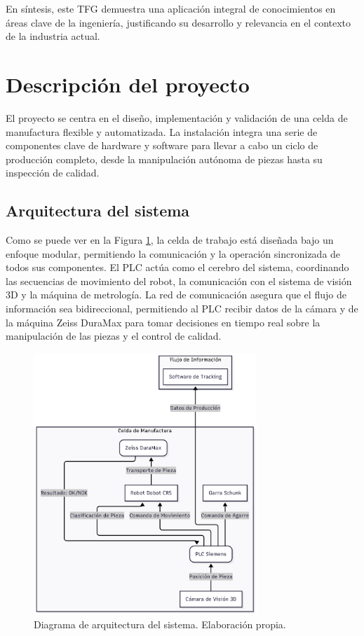 \documentclass[12pt, a4paper]{article}
\begin{document}
En síntesis, este TFG demuestra una aplicación integral de conocimientos en áreas clave de la ingeniería, justificando su desarrollo y relevancia en el contexto de la industria actual.

\section{Descripción del proyecto}
El proyecto se centra en el diseño, implementación y validación de una celda de manufactura flexible y automatizada. La instalación integra una serie de componentes clave de hardware y software para llevar a cabo un ciclo de producción completo, desde la manipulación autónoma de piezas hasta su inspección de calidad.

\subsection{Arquitectura del sistema}
Como se puede ver en la Figura \ref{fig:arquitectura}, la celda de trabajo está diseñada bajo un enfoque modular, permitiendo la comunicación y la operación sincronizada de todos sus componentes. El PLC actúa como el cerebro del sistema, coordinando las secuencias de movimiento del robot, la comunicación con el sistema de visión 3D y la máquina de metrología. La red de comunicación asegura que el flujo de información sea bidireccional, permitiendo al PLC recibir datos de la cámara y de la máquina Zeiss DuraMax para tomar decisiones en tiempo real sobre la manipulación de las piezas y el control de calidad.

\begin{figure}[h!]
    \centering
    \includegraphics[width=0.75\textwidth]{arquitecturav2.png}
    \caption{Diagrama de arquitectura del sistema. Elaboración propia.}
    \label{fig:arquitectura}
\end{figure}
\end{document}
